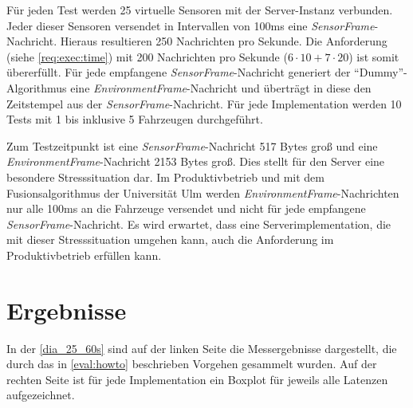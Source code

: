 Für jeden Test werden 25 virtuelle Sensoren mit der Server-Instanz verbunden.
Jeder dieser Sensoren versendet in Intervallen von 100ms eine \textit{SensorFrame}-Nachricht.
Hieraus resultieren 250 Nachrichten pro Sekunde.
Die Anforderung  (siehe \autoref{req:exec:time}) mit 200 Nachrichten pro Sekunde ($6 \cdot 10 + 7 \cdot 20$) ist somit übererfüllt.
Für jede empfangene \textit{SensorFrame}-Nachricht generiert der \enquote{Dummy}-Algorithmus eine \textit{EnvironmentFrame}-Nachricht und überträgt in diese den Zeitstempel aus der \textit{SensorFrame}-Nachricht.
Für jede Implementation werden 10 Tests mit 1 bis inklusive 5 Fahrzeugen durchgeführt.

Zum Testzeitpunkt ist eine \textit{SensorFrame}-Nachricht 517 Bytes groß und eine \textit{EnvironmentFrame}-Nachricht 2153 Bytes groß.
Dies stellt für den Server eine besondere Stresssituation dar.
Im Produktivbetrieb und mit dem Fusionsalgorithmus der Universität Ulm werden \textit{EnvironmentFrame}-Nachrichten nur alle 100ms an die Fahrzeuge versendet und nicht für jede empfangene \textit{SensorFrame}-Nachricht.
Es wird erwartet, dass eine Serverimplementation, die mit dieser Stresssituation umgehen kann, auch die Anforderung  im Produktivbetrieb erfüllen kann.

\section{Ergebnisse}
\label{eval:results}

In der \autoref{dia_25_60s} sind auf der linken Seite die Messergebnisse dargestellt, die durch das in \autoref{eval:howto} beschrieben Vorgehen gesammelt wurden.
Auf der rechten Seite ist für jede Implementation ein Boxplot für jeweils alle Latenzen aufgezeichnet.


